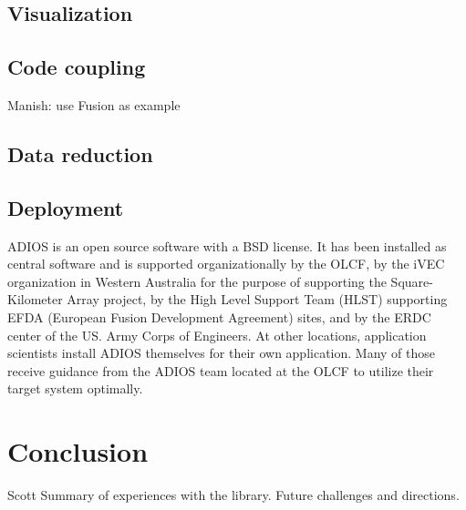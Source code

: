 \subsection{Visualization}



\subsection{Code coupling}
{\color {red}Manish: use Fusion as example}



\subsection{Data reduction}




\subsection{Deployment}
ADIOS is an open source software with a BSD license. It has been installed as central software and is supported organizationally by the OLCF, by the iVEC organization in Western Australia for the purpose of supporting the Square-Kilometer Array project, by the High Level Support Team (HLST) supporting EFDA (European Fusion Development Agreement) sites, and by the ERDC center of the US. Army Corps of Engineers. At other locations, application scientists install ADIOS themselves for their own application. Many of those receive guidance from the ADIOS team located at the OLCF to utilize their target system optimally.





\section{Conclusion}
{\color {red}Scott}
{\color {red}Summary of experiences with the library. Future challenges and directions.}


